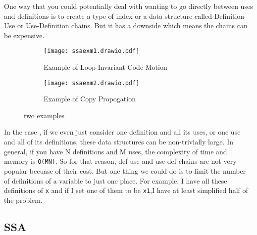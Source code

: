 One way that you could potentially deal with wanting to go directly between uses and definitions is to create a type of index or a data structure called Definition-Use or Use-Definition chains. But it has a downside which means the chains can be expensive.







\begin{figure}[h]
    \centering
    \begin{subfigure}[b]{0.4\textwidth}
        \centering
        \texttt{[image: ssaexm1.drawio.pdf]}
        \caption{Example of Loop-Invariant Code Motion}
        \label{fig:ssaexm1}
    \end{subfigure}
    \hfill
    \begin{subfigure}[b]{0.4\textwidth}
        \centering
        \texttt{[image: ssaexm2.drawio.pdf]}
        \caption{Example of Copy Propogation}
        \label{fig:ssaexm2}
    \end{subfigure}
      
    \caption{two examples}
\end{figure}


In the case , if we even just consider one definition and all its uses, or one use and all of its definitions, these data structures can be non-trivially large. In general, if you have N definitions and M uses, the complexity of time and memory is \texttt{O(MN)}. 
So for that reason, def-use and use-def chains are not very popular becuase of their cost. But one thing we could do is to limit the number of definitions of a variable
 to just one place. For example, I have all these definitions of \texttt{x} and if I set one of them to be \texttt{x1},I have at least simplified half of the problem.



\subsection{SSA}

